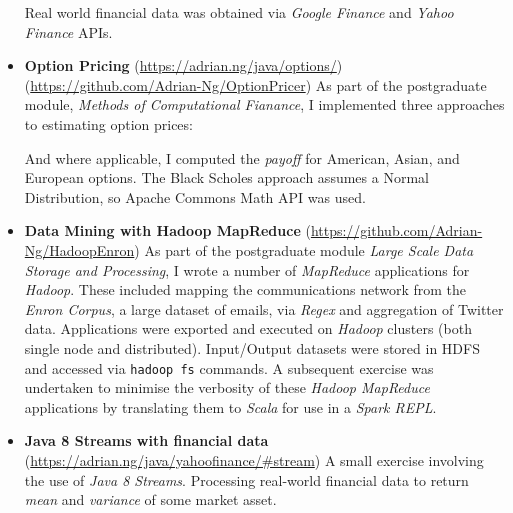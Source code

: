 \documentclass[letterpaper,11pt]{article}
\newcommand{\resumeItem}[3]{
	\item\small{
		\textbf{#1}\hfill\tiny{#2\\}\small{ #3 \vspace{-2pt}}
	}
}
\newcommand{\resumeSubItem}[3]{\resumeItem{#1}{#2}{#3}\vspace{-2pt}}
\begin{document}
\begin{itemize}
{	      Real world financial data was obtained via \textit{Google Finance} and \textit{Yahoo Finance} APIs.
	      }
	\item
	      {
	      \textbf{Option Pricing}
	      \hfill
	      \tiny
	      (\href{https://adrian.ng/java/options/}{https://adrian.ng/java/options/}) \quad (\href{https://github.com/Adrian-Ng/OptionPricer}{https://github.com/Adrian-Ng/OptionPricer})
	      \newline
	      \small
	      As part of the postgraduate module, \textit{Methods of Computational Fianance}, I implemented three approaches to estimating option prices:
	      And where applicable, I computed the \textit{payoff} for American, Asian, and European options.
	      The Black Scholes approach assumes a Normal Distribution, so Apache Commons Math API was used.
	      }
	\item
	      {
	      \textbf{Data Mining with Hadoop MapReduce}
	      \hfill
	      \tiny
	      (\href{https://github.com/Adrian-Ng/HadoopEnron}{https://github.com/Adrian-Ng/HadoopEnron})
	      \small
	      \newline
	      As part of the postgraduate module \textit{Large Scale Data Storage and Processing}, I wrote a number of \textit{MapReduce} applications for \textit{Hadoop}. These included mapping the communications network from the \textit{Enron Corpus}, a large dataset of emails, via \textit{Regex} and aggregation of Twitter data.
	      \newline
	      Applications were exported and executed on \textit{Hadoop} clusters (both single node and distributed). Input/Output datasets were stored in HDFS and accessed via \texttt{hadoop fs} commands.
	      \newline
	      A subsequent exercise was undertaken to minimise the verbosity of these \textit{Hadoop MapReduce} applications by translating them to \textit{Scala} for use in a \textit{Spark REPL}.
	      }
	\item {
	      \textbf{Java 8 Streams with financial data}
	      \hfill
	      \tiny
	      (\href{https://adrian.ng/java/yahoofinance/\#stream}{https://adrian.ng/java/yahoofinance/\#stream})
	      \small
	      \newline
	      A small exercise involving the use of \textit{Java 8 Streams}. Processing real-world financial data to return \textit{mean} and \textit{variance} of some market asset.
	      }
\end{itemize}
\end{document}
